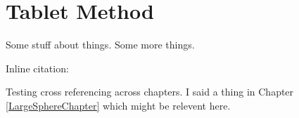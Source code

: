 \chapter{Tablet Method}
\label{TabletMethodChapter}

Some stuff about things.\cite{example-citation} Some more things. 

Inline citation: 

Testing cross referencing across chapters. I said a thing in Chapter \ref{LargeSphereChapter} which might be relevent here.

\blindtext
